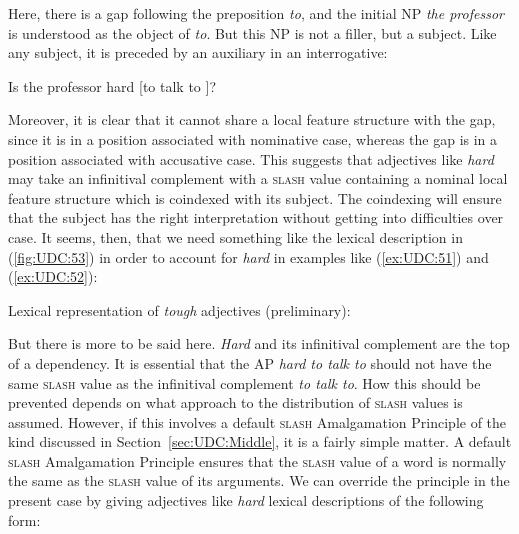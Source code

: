 \documentclass[output=paper
,notxmath 
 	        ,biblatex
                ,babelshorthands
                ,newtxmath
                ,draftmode
                ,colorlinks, citecolor=brown
]{langscibook}
\begin{document}
\noindent
Here, there is a gap following the preposition \emph{to}, and the
initial NP \emph{the professor} is understood as the object of
\emph{to}. But this NP is not a filler, but a subject. Like any subject,
it is preceded by an auxiliary in an interrogative:

\begin{exe}
\ex \label{ex:UDC:52}
 Is the professor hard [to talk to \trace{}]?
\end{exe}
 
\noindent
Moreover, it is clear that it cannot share a local feature structure
with the gap, since it is in a position associated with nominative case,
whereas the gap is in a position associated with accusative case. This
suggests that adjectives like \emph{hard} may take an infinitival
complement with a \textsc{slash} value containing a nominal local feature
structure which is coindexed with its subject. The coindexing will
ensure that the subject has the right interpretation without getting
into difficulties over case. It seems, then, that we need something like
the lexical description in (\ref{fig:UDC:53}) in order to account for \emph{hard} in examples like (\ref{ex:UDC:51})
and (\ref{ex:UDC:52}):
  
\ea
\label{fig:UDC:53}
Lexical representation of \textit{tough} adjectives (preliminary):\\
\z

\noindent
But there is more to be said here. \emph{Hard} and its infinitival
complement are the top of a dependency. It is essential that the AP
\emph{hard to talk to} should not have the same \textsc{slash} value
as the infinitival complement \emph{to talk to}. How this should be
prevented depends on what approach to the distribution of
\textsc{slash} values is assumed.  However, if this involves a default
\textsc{slash} Amalgamation Principle of the kind discussed in
Section~\ref{sec:UDC:Middle}, it is a fairly simple matter. A default
\textsc{slash} Amalgamation Principle ensures that the \textsc{slash}
value of a word is normally the same as the \textsc{slash} value of
its arguments. We can override the principle in the present case by
giving adjectives like \emph{hard} lexical descriptions of the
following form:
\end{document}
